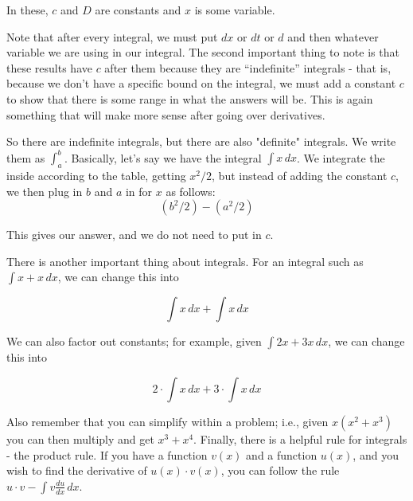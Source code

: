 In these, $c$ and $D$ are constants and $x$ is some variable.

Note that after every integral, we must put $dx$ or $dt$ or $d$ and then whatever variable we are using in our integral. 
The second important thing to note is that these results have $c$ after them because they are ``indefinite'' integrals - that is, because we don't have a specific bound on the integral, we must add a constant $c$ to show that there is some range in what the answers will be. 
This is again something that will make more sense after going over derivatives.

So there are indefinite integrals, but there are also "definite" integrals. 
We write them as $\int^b_a$. Basically, let's say we have the integral $\int x \, dx$. 
We integrate the inside according to the table, getting $x^2/2$, but instead of adding the constant $c$, we then plug in $b$ and $a$ in for $x$ as follows: 
\begin{equation*}
    (b^2/2) - (a^2/2)
\end{equation*}

This gives our answer, and we do not need to put in $c$.

There is another important thing about integrals. For an integral such as $\int x+x \, dx$, we can change this into

\begin{equation*}
    \int x \, dx + \int x \, dx
\end{equation*}

We can also factor out constants; for example, given $\int 2x + 3x \, dx$, we can change this into 

\begin{equation*}
    2\cdot \int x \, dx + 3 \cdot \int x \, dx
\end{equation*}

Also remember that you can simplify within a problem; i.e., given $x(x^2 + x^3)$ you can then multiply and get $x^3 + x^4$. 
Finally, there is a helpful rule for integrals - the product rule. 
If you have a function $v(x)$ and a function $u(x)$, and you wish to find the derivative of $u(x)\cdot v(x)$, you can follow the rule $u\cdot v - \int v\frac{du}{dx}\, dx$. 
